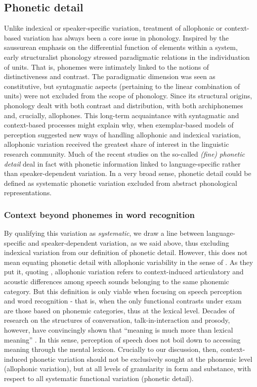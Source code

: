 \subsection{Phonetic detail}\label{sec112}
Unlike indexical or speaker-specific variation, treatment of allophonic or context-based variation has always been a core issue in phonology. Inspired by the saussurean emphasis on the differential function of elements within a system, early structuralist phonology stressed paradigmatic relations in the individuation of units. That is, phonemes were intimately linked to the notions of distinctiveness and contrast. The paradigmatic dimension was seen as constitutive, but syntagmatic aspects (pertaining to the linear combination of units) were not excluded from the scope of phonology. Since its structural origins, phonology dealt with both contrast and distribution, with both archiphonemes and, crucially, allophones. This long-term acquaintance with syntagmatic and context-based processes might explain why, when exemplar-based models of perception suggested new ways of handling allophonic and indexical variation, allophonic variation received the greatest share of interest in the linguistic research community. Much of the recent studies on the so-called \textit{(fine) phonetic detail} deal in fact with phonetic information linked to language-specific rather than speaker-dependent variation. In a very broad sense, phonetic detail could be defined as systematic phonetic variation excluded from abstract phonological representations. 

\subsubsection{Context beyond phonemes in word recognition}\label{sec1121}
By qualifying this variation as \textit{systematic}, we draw a line between language-specific and speaker-dependent variation, as we said above, thus excluding indexical variation from our definition of phonetic detail. However, this does not mean equating phonetic detail with allophonic variability in the sense of \citet{luce2003abstractness}. As they put it, quoting \citet{ladefoged2000course}, allophonic variation refers to context-induced articulatory and acoustic differences among speech sounds belonging to the same phonemic category. But this definition is only viable when focusing on speech perception and word recognition - that is, when the only functional contrasts under exam are those based on phonemic categories, thus at the lexical level. Decades of research on the structures of conversation, talk-in-interaction and prosody, however, have convincingly shown that ``meaning is much more than lexical meaning'' \citep{local2003variable}. In this sense, perception of speech does not boil down to accessing meaning through the mental lexicon. Crucially to our discussion, then, context-induced phonetic variation should not be exclusively sought at the phonemic level (allophonic variation), but at all levels of granularity in form and substance, with respect to all systematic functional variation (phonetic detail). 

